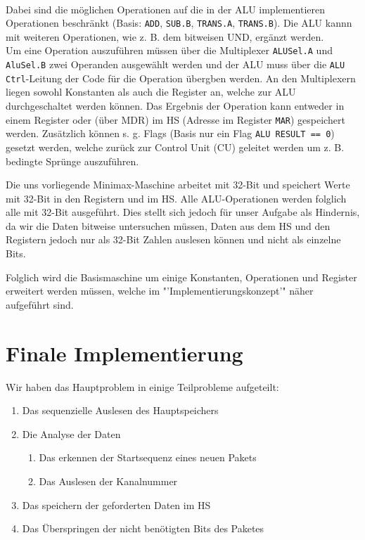 \documentclass[12pt,titlepage]{article}
\begin{document}
\leavevmode \\

Dabei sind die m{\"o}glichen Operationen auf die in der ALU implementieren
Operationen beschr{\"a}nkt (Basis: \texttt{ADD}, \texttt{SUB.B}, \texttt{TRANS.A}, \texttt{TRANS.B}). Die ALU kannn mit weiteren Operationen,
wie z. B. dem bitweisen UND, erg{\"a}nzt werden.\\
Um eine Operation auszuf{\"u}hren m{\"u}ssen {\"u}ber die Multiplexer \texttt{ALUSel.A} und \texttt{AluSel.B} zwei Operanden ausgew{\"a}hlt werden
und der ALU muss {\"u}ber die \texttt{ALU Ctrl}-Leitung der Code f{\"u}r die Operation {\"u}bergben werden. An den Multiplexern liegen sowohl
Konstanten als auch die Register an, welche zur ALU durchgeschaltet werden k{\"o}nnen. Das Ergebnis der Operation kann
entweder in einem Register oder (über MDR) im HS (Adresse im Register \texttt{MAR}) gespeichert werden. Zus{\"a}tzlich k{\"o}nnen s. g. Flags (Basis nur ein Flag \texttt{ALU RESULT == 0})
gesetzt werden, welche zur{\"u}ck zur Control Unit (CU) geleitet werden um z. B. bedingte Spr{\"u}nge auszuf{\"u}hren.


Die uns vorliegende Minimax-Maschine arbeitet mit 32-Bit und speichert Werte mit 32-Bit in den Registern und im HS.
Alle ALU-Operationen werden folglich alle mit 32-Bit ausgef{\"u}hrt. Dies stellt sich jedoch f{\"u}r unser Aufgabe als
Hindernis, da wir die Daten bitweise untersuchen m{\"u}ssen, Daten aus dem HS und den Registern jedoch nur als
32-Bit Zahlen auslesen k{\"o}nnen und nicht als einzelne Bits.

Folglich wird die Basismaschine um einige Konstanten, Operationen und Register erweitert werden müssen, welche im "'Implementierungskonzept'" n{\"a}her
aufgeführt sind.

\newpage

\section{Finale Implementierung}
Wir haben das Hauptproblem in einige Teilprobleme aufgeteilt:
\begin{enumerate}
\item Das sequenzielle Auslesen des Hauptspeichers
\item Die Analyse der Daten
    \begin{enumerate}
    \item Das erkennen der Startsequenz eines neuen Pakets
    \item Das Auslesen der Kanalnummer
    \end{enumerate}
\item Das speichern der geforderten Daten im HS
\item Das Überspringen der nicht benötigten Bits des Paketes
\end{enumerate}
\end{document}
